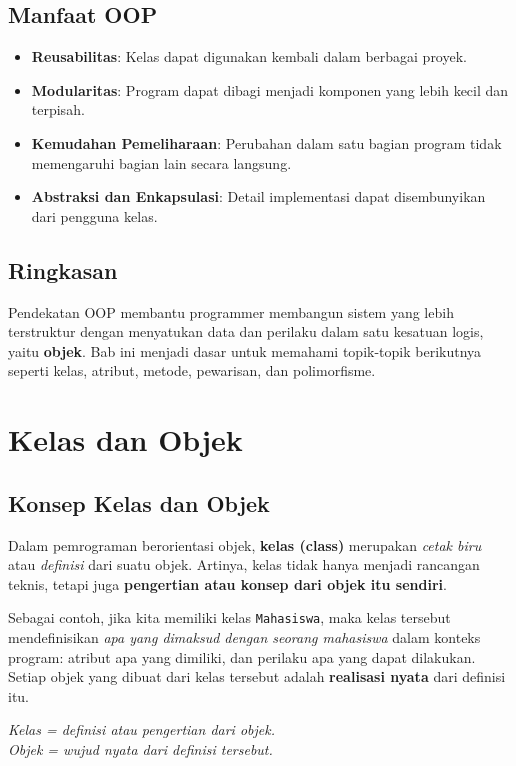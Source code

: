 \subsection*{Manfaat OOP}
\begin{itemize}
    \item \textbf{Reusabilitas}: Kelas dapat digunakan kembali dalam berbagai proyek.
    \item \textbf{Modularitas}: Program dapat dibagi menjadi komponen yang lebih kecil dan terpisah.
    \item \textbf{Kemudahan Pemeliharaan}: Perubahan dalam satu bagian program tidak memengaruhi bagian lain secara langsung.
    \item \textbf{Abstraksi dan Enkapsulasi}: Detail implementasi dapat disembunyikan dari pengguna kelas.
\end{itemize}

\subsection*{Ringkasan}
Pendekatan OOP membantu programmer membangun sistem yang lebih terstruktur dengan menyatukan data dan perilaku dalam satu kesatuan logis, yaitu \textbf{objek}. Bab ini menjadi dasar untuk memahami topik-topik berikutnya seperti kelas, atribut, metode, pewarisan, dan polimorfisme.


\section{Kelas dan Objek}

\subsection{Konsep Kelas dan Objek}
Dalam pemrograman berorientasi objek, \textbf{kelas (class)} merupakan \emph{cetak biru} atau \emph{definisi} dari suatu objek.  
Artinya, kelas tidak hanya menjadi rancangan teknis, tetapi juga \textbf{pengertian atau konsep dari objek itu sendiri}.  

Sebagai contoh, jika kita memiliki kelas \texttt{Mahasiswa}, maka kelas tersebut mendefinisikan \emph{apa yang dimaksud dengan seorang mahasiswa} dalam konteks program: atribut apa yang dimiliki, dan perilaku apa yang dapat dilakukan.  
Setiap objek yang dibuat dari kelas tersebut adalah \textbf{realisasi nyata} dari definisi itu.

\begin{center}
\textit{Kelas = definisi atau pengertian dari objek.} \\
\textit{Objek = wujud nyata dari definisi tersebut.}
\end{center}


